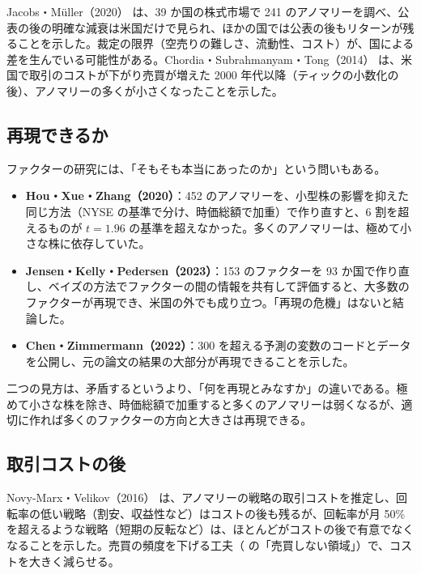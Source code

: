 Jacobs・Müller（2020）\cite{jacobsmuller2020} は、39 か国の株式市場で 241 のアノマリーを調べ、公表の後の明確な減衰は米国だけで見られ、ほかの国では公表の後もリターンが残ることを示した。裁定の限界（空売りの難しさ、流動性、コスト）が、国による差を生んでいる可能性がある。Chordia・Subrahmanyam・Tong（2014）\cite{cst2014} は、米国で取引のコストが下がり売買が増えた 2000 年代以降（ティックの小数化の後）、アノマリーの多くが小さくなったことを示した。

\subsection{再現できるか}

ファクターの研究には、「そもそも本当にあったのか」という問いもある。

\begin{itemize}
\item \textbf{Hou・Xue・Zhang（2020）}\cite{hxz2020}：452 のアノマリーを、小型株の影響を抑えた同じ方法（NYSE の基準で分け、時価総額で加重）で作り直すと、6 割を超えるものが $t = 1.96$ の基準を超えなかった。多くのアノマリーは、極めて小さな株に依存していた。
\item \textbf{Jensen・Kelly・Pedersen（2023）}\cite{jkp2023}：153 のファクターを 93 か国で作り直し、ベイズの方法でファクターの間の情報を共有して評価すると、大多数のファクターが再現でき、米国の外でも成り立つ。「再現の危機」はないと結論した。
\item \textbf{Chen・Zimmermann（2022）}\cite{chenzimmermann2022}：300 を超える予測の変数のコードとデータを公開し、元の論文の結果の大部分が再現できることを示した。
\end{itemize}

二つの見方は、矛盾するというより、「何を再現とみなすか」の違いである。極めて小さな株を除き、時価総額で加重すると多くのアノマリーは弱くなるが、適切に作れば多くのファクターの方向と大きさは再現できる。

\subsection{取引コストの後}

Novy-Marx・Velikov（2016）\cite{novymarxvelikov2016} は、アノマリーの戦略の取引コストを推定し、回転率の低い戦略（割安、収益性など）はコストの後も残るが、回転率が月 50\% を超えるような戦略（短期の反転など）は、ほとんどがコストの後で有意でなくなることを示した。売買の頻度を下げる工夫（ の「売買しない領域」）で、コストを大きく減らせる。

